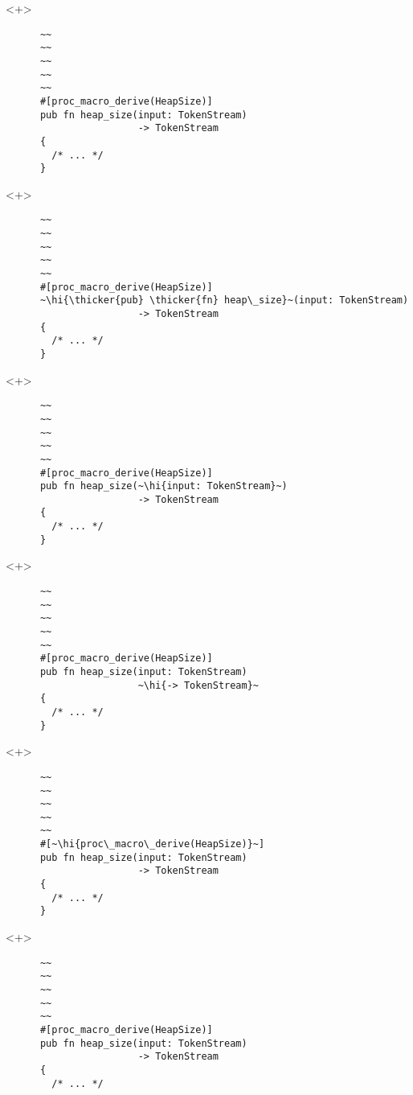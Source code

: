 \documentclass[usepdftitle=false]{beamer}
\renewcommand{\&}{\makebox[\widthof{\ampersand}][c]{\scalebox{0.9}[1.0]{\Book\ampersand}}}
\newcommand{\+}{\makebox[\widthof{+}][c]{\raisebox{-.2\height}{\scalefont{1.5}\Light+}}}
\newcommand{\thicker}[1]{\contourlength{0.26pt}\contour[10]{black}{#1}}
\newcommand{\hi}[1]{%
\tikz[baseline=(A.base)]
 \node[highlighting=0,inner sep=0pt,text depth=0pt] (A) {#1};%
}
\begin{document}
\begin{frame}[fragile]
  \begin{onlyenv}<+>
    \begin{verbatim}
      ~~
      ~~
      ~~
      ~~
      ~~
      #[proc_macro_derive(HeapSize)]
      pub fn heap_size(input: TokenStream)
                       -> TokenStream
      {
        /* ... */
      }
    \end{verbatim}
  \end{onlyenv}
  \begin{onlyenv}<+>
    \begin{verbatim}
      ~~
      ~~
      ~~
      ~~
      ~~
      #[proc_macro_derive(HeapSize)]
      ~\hi{\thicker{pub} \thicker{fn} heap\_size}~(input: TokenStream)
                       -> TokenStream
      {
        /* ... */
      }
    \end{verbatim}
  \end{onlyenv}
  \begin{onlyenv}<+>
    \begin{verbatim}
      ~~
      ~~
      ~~
      ~~
      ~~
      #[proc_macro_derive(HeapSize)]
      pub fn heap_size(~\hi{input: TokenStream}~)
                       -> TokenStream
      {
        /* ... */
      }
    \end{verbatim}
  \end{onlyenv}
  \begin{onlyenv}<+>
    \begin{verbatim}
      ~~
      ~~
      ~~
      ~~
      ~~
      #[proc_macro_derive(HeapSize)]
      pub fn heap_size(input: TokenStream)
                       ~\hi{-> TokenStream}~
      {
        /* ... */
      }
    \end{verbatim}
  \end{onlyenv}
  \begin{onlyenv}<+>
    \begin{verbatim}
      ~~
      ~~
      ~~
      ~~
      ~~
      #[~\hi{proc\_macro\_derive(HeapSize)}~]
      pub fn heap_size(input: TokenStream)
                       -> TokenStream
      {
        /* ... */
      }
    \end{verbatim}
  \end{onlyenv}
  \begin{onlyenv}<+>
    \begin{verbatim}
      ~~
      ~~
      ~~
      ~~
      ~~
      #[proc_macro_derive(HeapSize)]
      pub fn heap_size(input: TokenStream)
                       -> TokenStream
      {
        /* ... */

\end{verbatim}
\end{onlyenv}
\end{frame}
\end{document}
